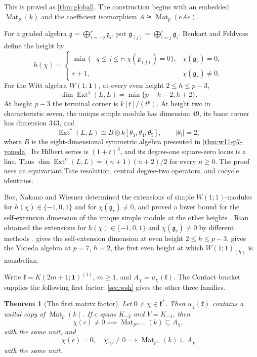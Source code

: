 \documentclass[11pt,reqno]{amsart}
\newtheorem{theorem}{Theorem}[section]
\theoremstyle{definition}
\theoremstyle{remark}
\theoremstyle{definition}
\newcommand{\kk}{\mathfrak{k}}
\newcommand{\Achi}{A_{\chi}}
\newcommand{\Mat}{\operatorname{Mat}}
\newcommand{\Ext}{\operatorname{Ext}}
\begin{document}
This is proved as \cref{thm:global}. The construction begins with an embedded $\Mat_p(k)$ and
the coefficient isomorphism $A\cong\Mat_p(eAe)$.

For a graded algebra
$\mathfrak g=\bigoplus_{i=-q}^{r}\mathfrak g_i$, put
$\mathfrak g_{(j)}=\bigoplus_{i=j}^{r}\mathfrak g_i$.
Benkart and Feldvoss \cite[(2.4)]{BenkartFeldvoss2015} define the height by
\[
 h(\chi)=
 \begin{cases}
 \min\{-q\le j\le r:\chi(\mathfrak g_{(j)})=0\},
       &\chi(\mathfrak g_r)=0,\\
 r+1,&\chi(\mathfrak g_r)\ne0.
 \end{cases}
\]
For the Witt algebra $W(1;\mathbf1)$, at every even height $2\le h\le p-3$,
\[
 \dim\Ext^1(L,L)=\min\{p-h-2,h+2\}.
\]
At height $p-3$ the terminal corner is $k[t]/(t^p)$.
At height two in characteristic seven, the unique simple module has
dimension $49$, its basic corner has dimension $343$, and
\[
 \Ext^*(L,L)\cong B\otimes k[\theta_3,\theta_4,\theta_5],
 \qquad |\theta_i|=2,
\]
where $B$ is the eight-dimensional symmetric algebra presented in
\cref{thm:w11-p7-yoneda}. Its Hilbert series is $(1+t)^3$, and its
degree-one square-zero locus is a line.
Thus $\dim\Ext^n(L,L)=(n+1)(n+2)/2$ for every $n\ge0$.
The proof uses an equivariant Tate resolution, central degree-two
operators, and cocycle identities.

Boe, Nakano and Wiesner determined the extensions of simple
$W(1;1)$-modules for $h(\chi)\in\{-1,0,1\}$ and for
$\chi(\mathfrak g_r)\ne0$, and proved a lower bound for the
self-extension dimension of the unique simple module at the other
heights \cite[\S4]{BoeNakanoWiesner2009}.
Rian obtained the extensions for $h(\chi)\in\{-1,0,1\}$ and
$\chi(\mathfrak g_r)\ne0$ by different methods
\cite{RianThesis2011,Rian2011}.
 gives the self-extension dimension at even height
$2\le h\le p-3$.  gives the Yoneda algebra at
$p=7$, $h=2$, the first even height at which $W(1;1)_{(h)}$ is
nonabelian.

Write $\kk=K(2m+1;\mathbf1)^{(1)}$, $m\ge1$, and
$\Achi=u_\chi(\kk)$. The Contact bracket supplies the following first
factor; \cref{sec:wsh} gives the other three families.

\begin{theorem}[The first matrix factor]\label{thm:first-matrix}
Let $0\ne\chi\in\kk^*$.  Then $u_\chi(\kk)$ contains a unital copy of
$\Mat_p(k)$.  If $c$ spans $K_{-2}$ and
$V=K_{-1}$, then
\[
\chi(c)\ne0\implies \Mat_{p^{m+1}}(k)\subseteq \Achi,
\]
with the same unit, and
\[
\chi(c)=0,\quad \chi|_V\ne0
\implies \Mat_{p^m}(k)\subseteq \Achi
\]
with the same unit.
\end{theorem}
\end{document}

